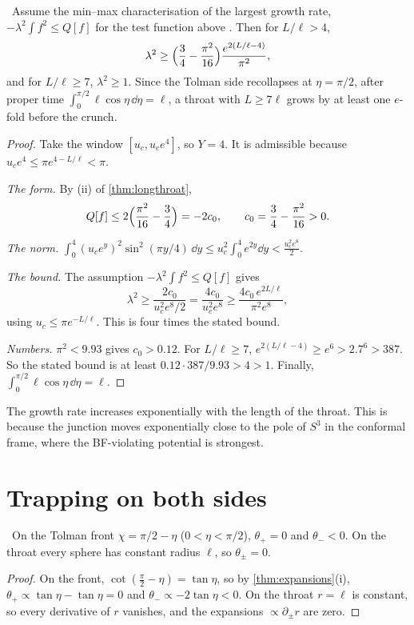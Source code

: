 \begin{theorem}\label{thm:growth}\ver\
Assume the min--max characterisation of the largest growth rate, $-\lambda^2\int f^2\le Q[f]$ for the test function above \ext. Then for $L/\ell>4$,
\[
\lambda^2\ge\Bigl(\frac34-\frac{\pi^2}{16}\Bigr)\frac{e^{2(L/\ell-4)}}{\pi^2},
\]
and for $L/\ell\ge7$, $\lambda^2\ge1$. Since the Tolman side recollapses at $\eta=\pi/2$, after proper time $\int_0^{\pi/2}\ell\cos\eta\,\dd\eta=\ell$, a throat with $L\ge7\ell$ grows by at least one $e$-fold before the crunch.
\end{theorem}
\begin{proof}
Take the window $[u_c,u_ce^4]$, so $Y=4$. It is admissible because $u_ce^4\le\pi e^{4-L/\ell}<\pi$.

\emph{The form.} By (ii) of \cref{thm:longthroat},
\[
Q[f]\le2\Bigl(\frac{\pi^2}{16}-\frac34\Bigr)=-2c_0,\qquad c_0=\frac34-\frac{\pi^2}{16}>0 .
\]

\emph{The norm.} $\int_0^4(u_ce^y)^2\sin^2(\pi y/4)\,\dd y\le u_c^2\int_0^4e^{2y}\dd y<\frac{u_c^2e^8}2$.

\emph{The bound.} The assumption $-\lambda^2\int f^2\le Q[f]$ gives
\[
\lambda^2\ge\frac{2c_0}{u_c^2e^8/2}=\frac{4c_0}{u_c^2e^8}\ge\frac{4c_0\,e^{2L/\ell}}{\pi^2e^8},
\]
using $u_c\le\pi e^{-L/\ell}$. This is four times the stated bound.

\emph{Numbers.} $\pi^2<9.93$ gives $c_0>0.12$. For $L/\ell\ge7$, $e^{2(L/\ell-4)}\ge e^6>2.7^6>387$. So the stated bound is at least $0.12\cdot387/9.93>4>1$. Finally, $\int_0^{\pi/2}\ell\cos\eta\,\dd\eta=\ell$.
\end{proof}


The growth rate increases exponentially with the length of the throat. This is because the junction moves exponentially close to the pole of $S^3$ in the conformal frame, where the BF-violating potential is strongest.

\section{Trapping on both sides}

\begin{proposition}\label{prop:bothtrapped}\ver\
On the Tolman front $\chi=\pi/2-\eta$ ($0<\eta<\pi/2$), $\theta_+=0$ and $\theta_-<0$. On the throat every sphere has constant radius $\ell$, so $\theta_\pm=0$.
\end{proposition}
\begin{proof}
On the front, $\cot(\frac\pi2-\eta)=\tan\eta$, so by \cref{thm:expansions}(i), $\theta_+\propto\tan\eta-\tan\eta=0$ and $\theta_-\propto-2\tan\eta<0$. On the throat $r=\ell$ is constant, so every derivative of $r$ vanishes, and the expansions $\propto\partial_\pm r$ are zero.
\end{proof}


